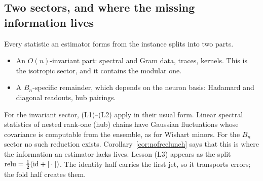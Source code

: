 \subsection{Two sectors, and where the missing information lives}
Every statistic an estimator forms from the instance splits into two parts.
\begin{itemize}[leftmargin=*]
\item An $O(n)$-invariant part: spectral and Gram data, traces, kernels. This is the isotropic sector, and it contains the modular one.
\item A $B_n$-specific remainder, which depends on the neuron basis: Hadamard and diagonal readouts, hub pairings.
\end{itemize}
For the invariant sector, (L1)--(L2) apply in their usual form. Linear spectral statistics of nested rank-one (hub) chains have Gaussian
fluctuations whose covariance is computable from the ensemble, as for Wishart minors. For the $B_n$ sector no such reduction exists.
Corollary~\ref{cor:nofreelunch} says that this is where the information an estimator lacks lives. Lesson (L3) appears as the split
$\operatorname{relu}=\frac12(\mathrm{id}+|\cdot|)$. The identity half carries the first jet, so it transports errors; the fold half creates them.
